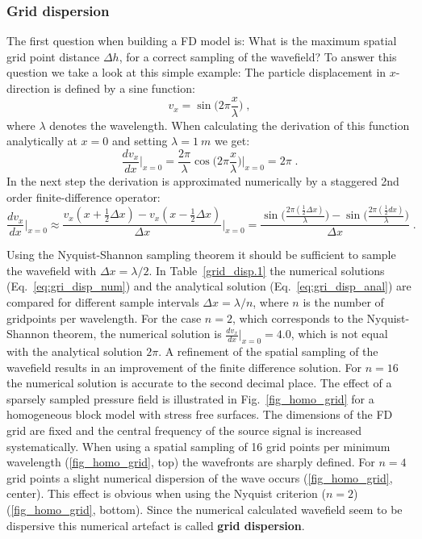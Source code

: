\subsubsection{Grid dispersion}
\label{grid-dispersion}
The first question when building a FD model is: What is the maximum spatial grid point distance $\Delta h$, for a correct sampling of the wavefield? To answer this question we take a look at this simple example: The particle displacement in $x$-direction is defined by a sine function:
\begin{equation}
   v_x=\sin\biggl(2 \pi \frac{x}{\lambda}\biggr) \;,
   \label{eq:gri_disp}
\end{equation}
where $\lambda$ denotes the wavelength. When calculating the derivation of this function analytically at $x=0$ and setting $\lambda=\SI{1}{m}$ we get:
\begin{equation}
    \frac{d v_x}{d x}\biggl|_{x=0} = \frac{2 \pi}{\lambda} \cos\biggl(2 \pi \frac{x}{\lambda}\biggr)\biggl|_{x=0}=2 \pi\;.
    \label{eq:gri_disp_anal}
\end{equation}
In the next step the derivation is approximated numerically by a staggered 2nd order finite-difference operator:
\begin{equation}
    \frac{d v_x}{d x}\biggl|_{x=0} \approx \frac{v_x(x+\frac{1}{2}\Delta x)-v_x(x-\frac{1}{2}\Delta x)}{\Delta x}\biggl|_{x=0}=\frac{\sin \biggl(\frac{2 \pi (\frac{1}{2}{\Delta x})}{\lambda} \biggr)-\sin \biggl(\frac{2 \pi (\frac{1}{2}{dx})}{\lambda} \biggr)}{\Delta x}\;.
    \label{eq:gri_disp_num}
\end{equation}

Using the Nyquist-Shannon sampling theorem it should be sufficient to sample the wavefield with $\Delta x = \lambda/2$. In Table~\ref{grid_disp.1} the numerical solutions (Eq.~\ref{eq:gri_disp_num}) and the analytical solution (Eq.~\ref{eq:gri_disp_anal}) are compared for different sample intervals $\Delta x = \lambda /n$, where $n$ is the number of gridpoints per wavelength. For the case $n=2$, which corresponds to the Nyquist-Shannon theorem, the numerical solution is $\frac{d v_x}{d x}|_{x=0}=4.0$, which is not equal with the analytical solution $2 \pi$. A refinement of the spatial sampling of the wavefield results in an improvement of the finite difference solution. For $n=16$ the numerical solution is accurate to the second decimal place. The effect of a sparsely sampled pressure field is illustrated in Fig.~\ref{fig_homo_grid} for a homogeneous block model with stress free surfaces. The dimensions of the FD grid are fixed and the central frequency of the source signal is increased systematically.  When using a spatial sampling of 16 grid points per minimum wavelength (\ref{fig_homo_grid}, top) the wavefronts are sharply defined. For $n=4$  grid points a slight numerical dispersion of the wave occurs (\ref{fig_homo_grid}, center). This effect is obvious when using the Nyquist criterion ($n=2$) (\ref{fig_homo_grid}, bottom). Since the numerical calculated wavefield seem to be dispersive this numerical artefact is called {\textbf{grid dispersion}}. 

